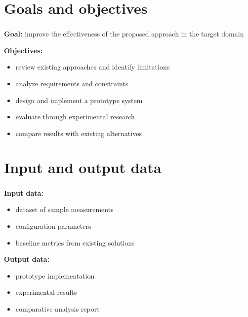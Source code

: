
\frame[plain]{\titlepage} %


\section{Goals and objectives}

\begin{frame}
    \frametitle{\insertsection}

    \textbf{Goal:} improve the effectiveness of the proposed approach in the target domain

    \vspace{\baselineskip}

    \textbf{Objectives:}
    \begin{itemize}
        \item review existing approaches and identify limitations
        \item analyze requirements and constraints
        \item design and implement a prototype system
        \item evaluate through experimental research
        \item compare results with existing alternatives
    \end{itemize}
\end{frame}


\section{Input and output data}

\begin{frame}
    \frametitle{\insertsection}

    \textbf{Input data:}
    \begin{itemize}
        \item dataset of sample measurements
        \item configuration parameters
        \item baseline metrics from existing solutions
    \end{itemize}

    \vspace{\baselineskip}

    \textbf{Output data:}
    \begin{itemize}
        \item prototype implementation
        \item experimental results
        \item comparative analysis report
    \end{itemize}
\end{frame}

